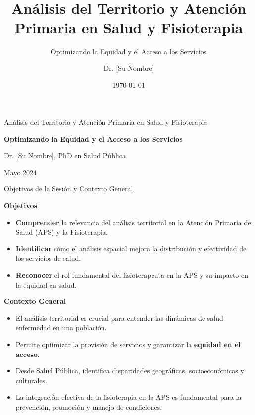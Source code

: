 \documentclass[aspectratio=169]{beamer}
\title[Análisis del Territorio y Aten]{Análisis del Territorio y Atención Primaria en Salud y Fisioterapia}
\subtitle{Optimizando la Equidad y el Acceso a los Servicios}
\author{Dr. [Su Nombre]}
\institute{PhD en Salud Pública}
\date{\today}
\begin{document}
\begin{frame}
  \titlepage
\end{frame}

\usebackgroundtemplate{}


\begin{frame}{Análisis del Territorio y Atención Primaria en Salud y Fisioterapia}

\textbf{Optimizando la Equidad y el Acceso a los Servicios}

Dr. [Su Nombre], PhD en Salud Pública

Mayo 2024

\end{frame}

\begin{frame}{Objetivos de la Sesión y Contexto General}


\textbf{Objetivos}
\begin{itemize}
  \item \textbf{Comprender} la relevancia del análisis territorial en la Atención Primaria de Salud (APS) y la Fisioterapia.
  \item \textbf{Identificar} cómo el análisis espacial mejora la distribución y efectividad de los servicios de salud.
  \item \textbf{Reconocer} el rol fundamental del fisioterapeuta en la APS y su impacto en la equidad en salud.
\end{itemize}
\textbf{Contexto General}
\begin{itemize}
  \item El análisis territorial es crucial para entender las dinámicas de salud-enfermedad en una población.
  \item Permite optimizar la provisión de servicios y garantizar la \textbf{equidad en el acceso}.
  \item Desde Salud Pública, identifica disparidades geográficas, socioeconómicas y culturales.
  \item La integración efectiva de la fisioterapia en la APS es fundamental para la prevención, promoción y manejo de condiciones.
\end{itemize}
\end{frame}
\end{document}
